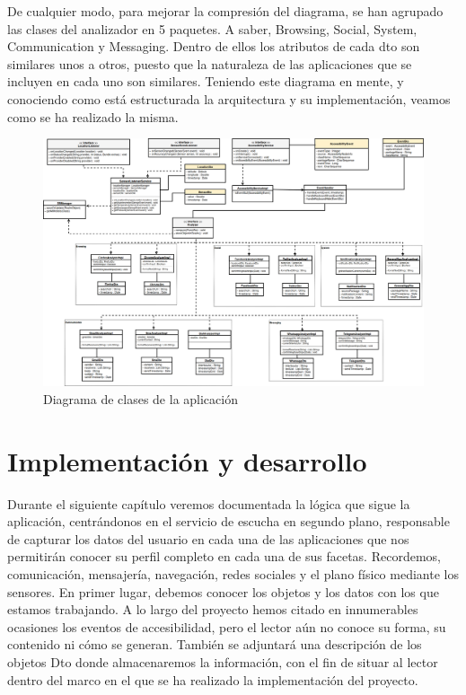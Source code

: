 \documentclass[12pt,a4paper,oneside]{book} %
\begin{document}
\newline \newline
De cualquier modo, para mejorar la compresión del diagrama, se han agrupado las clases del analizador en 5 paquetes. A saber, Browsing, Social, System, Communication y Messaging. Dentro de ellos los atributos de cada dto son similares unos a otros, puesto que la naturaleza de las aplicaciones que se incluyen en cada uno son similares. 
\newline \newline
Teniendo este diagrama en mente, y conociendo como está estructurada la arquitectura y su implementación, veamos como se ha realizado la misma. 
\begin{landscape}
\begin{figure}[htb]
\begin{center}
		\includegraphics[scale=0.32]{pictures/classDiagram/classDiagram.png} 
	\caption[Diagrama de clases de la aplicación]{Diagrama de clases de la aplicación}
	\end{center}
\end{figure}
\end{landscape}
\chapter{Implementación y desarrollo}
Durante el siguiente capítulo veremos documentada la lógica que sigue la aplicación, centrándonos en el servicio de escucha en segundo plano, responsable de capturar los datos del usuario en cada una de las aplicaciones que nos permitirán conocer su perfil completo en cada una de sus facetas. Recordemos, comunicación, mensajería, navegación, redes sociales y el plano físico mediante los sensores. 
\newline \newline 
En primer lugar, debemos conocer los objetos y los datos con los que estamos trabajando. A lo largo del proyecto hemos citado en innumerables ocasiones los eventos de accesibilidad, pero el lector aún no conoce su forma, su contenido ni cómo se generan. También se adjuntará una descripción de los objetos Dto donde almacenaremos la información, con el fin de situar al lector dentro del marco en el que se ha realizado la implementación del proyecto. 
\newpage
\end{document}

